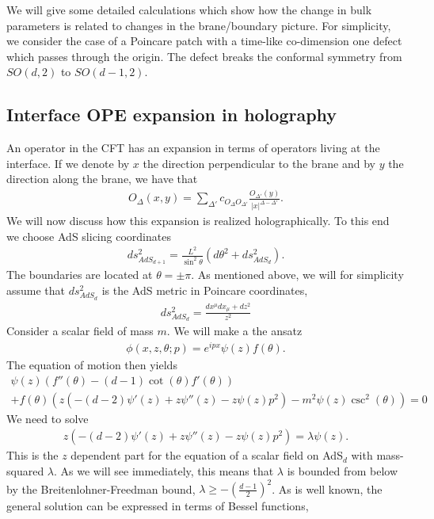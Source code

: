 %



We will give some detailed calculations which show how the change in bulk parameters is related to changes in the brane/boundary picture. For simplicity, we consider the case of a Poincare patch with a time-like co-dimension one defect which passes through the origin. The defect breaks the conformal symmetry from $SO(d,2)$ to $SO(d-1,2)$.

\subsection{Interface OPE expansion in holography}
An operator in the CFT has an expansion in terms of operators living at the interface. If we denote by $x$ the direction perpendicular to the brane and by $y$ the direction along the brane, we have that
\begin{align}
    O_{\Delta}(x,y) = \sum_{\Delta'} c_{O_{\Delta}O_{\Delta'}} \frac{O_{\Delta'}(y)}{|x|^{\Delta - \Delta'}}.
\end{align}
We will now discuss how this expansion is realized holographically. To this end we choose AdS slicing coordinates
\begin{align}
    ds_{AdS_{d+1}}^2 = \frac{L^2}{\sin^2 \theta}(d\theta^2 + ds_{AdS_d}^2).
\end{align}
The boundaries are located at $\theta = \pm \pi$.
As mentioned above, we will for simplicity assume that $ds_{AdS_d}^2$ is the AdS metric in Poincare coordinates,
\begin{align}
    ds_{AdS_d}^2 = \frac{dx^\mu dx_\mu + dz^2}{z^2}
\end{align}
Consider a scalar field of mass $m$. We will make a the ansatz
\begin{align}
    \phi(x,z,\theta;p) = e^{i p x} \psi(z) f(\theta).
\end{align}
The equation of motion then yields
\begin{align}
    \psi(z) \left(f''(\theta )-(d-1) \cot (\theta ) f'(\theta )\right)\\
    +f(\theta ) \left(z \left(-(d-2) \psi'(z) +z \psi''(z)-z \psi(z) p^2\right)-m^2 \psi(z) \csc ^2(\theta )\right) = 0
\end{align}
We need to solve
\begin{align}
    z \left(-(d-2) \psi'(z)+z \psi''(z) - z \psi(z) p^2 \right)=\lambda  \psi(z).
\end{align}
This is the $z$ dependent part for the equation of a scalar field on AdS$_d$ with mass-squared $\lambda$. As we will see immediately, this means that $\lambda$ is bounded from below by the Breitenlohner-Freedman bound, $\lambda \geq - (\frac{d-1}{2})^2$. As is well known, the general solution can be expressed in terms of Bessel functions,
